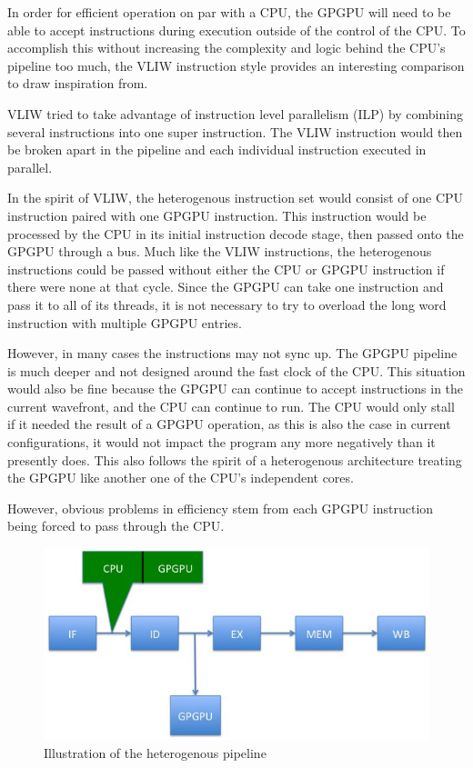 In order for efficient operation on par with a CPU, the GPGPU will need to be able to accept instructions during execution outside of the control of the CPU. To accomplish this without increasing the complexity and logic behind the CPU's pipeline too much, the VLIW instruction style provides an interesting comparison to draw inspiration from. 

VLIW tried to take advantage of instruction level parallelism (ILP) by combining several instructions into one super instruction. The VLIW instruction would then be broken apart in the pipeline and each individual instruction executed in parallel. 

In the spirit of VLIW, the heterogenous instruction set would consist of one CPU instruction paired with one GPGPU instruction. This instruction would be processed by the CPU in its initial instruction decode stage, then passed onto the GPGPU through a bus. Much like the VLIW instructions, the heterogenous instructions could be passed without either the CPU or GPGPU instruction if there were none at that cycle. Since the GPGPU can take one instruction and pass it to all of its threads, it is not necessary to try to overload the long word instruction with multiple GPGPU entries.

However, in many cases the instructions may not sync up. The GPGPU pipeline is much deeper and not designed around the fast clock of the CPU. This situation would also be fine because the GPGPU can continue to accept instructions in the current wavefront, and the CPU can continue to run. The CPU would only stall if it needed the result of a GPGPU operation, as this is also the case in current configurations, it would not impact the program any more negatively than it presently does. This also follows the spirit of a heterogenous architecture treating the GPGPU like another one of the CPU's independent cores. 

However, obvious problems in efficiency stem from each GPGPU instruction being forced to pass through the CPU. 

\begin{figure}[h]
\includegraphics[scale=0.75]{diagrams/diag1.jpg}
\caption{Illustration of the heterogenous pipeline}
\end{figure}


